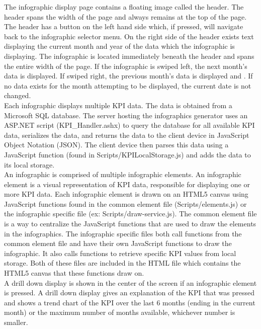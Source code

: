\documentclass[11pt,a4paper,oneside]{article}
\begin{document}
The infographic display page contains a floating image called the header.  The header spans the width of the page and always remains at the top of the page.  The header has a button on the left hand side which, if pressed, will navigate back to the infographic selector menu.  On the right side of the header exists text displaying the current month and year of the data which the infographic is displaying.  The infographic is located immediately beneath the header and spans the entire width of the page.  If the infographic is swiped left, the next month's data is displayed.  If swiped right, the previous month's data is displayed and .  If no data exists for the month attempting to be displayed, the current date is not changed.\\


Each infographic displays multiple KPI data.  The data is obtained from a Microsoft SQL database.  The server hosting the infographics generator uses an ASP.NET script (KPI_Handler.ashx) to query the database for all available KPI data, serializes the data, and returns the data to the client device in JavaScript Object Notation (JSON).  The client device then parses this data using a JavaScript function (found in Scripts/KPILocalStorage.js) and adds the data to its local storage.\\


An infographic is comprised of multiple infographic elements. An infographic element is a visual representation of KPI data, responsible for displaying one or more KPI data.  Each infographic element is drawn on an HTML5 canvas using JavaScript functions found in the common element file (Scripts/elements.js) or the infographic specific file (ex: Scripts/draw-service.js).  The common element file is a way to centralize the JavaScript functions that are used to draw the elements in the infographics.  The infographic specific files both call functions from the common element file and have their own JavaScript functions to draw the infographic.  It also calls functions to retrieve specific KPI values from local storage.  Both of these files are included in the HTML file which contains the HTML5 canvas that these functions draw on.\\


A drill down display is shown in the center of the screen if an infographic element is pressed.  A drill down display gives an explanation of the KPI that was pressed and shows a trend chart of the KPI over the last 6 months (ending in the current month) or the maximum number of months available, whichever number is smaller.\\
\end{document}
